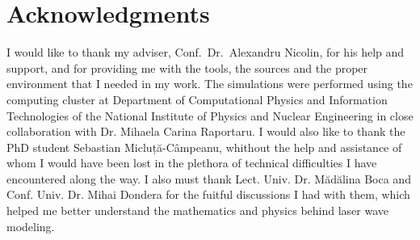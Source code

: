 \documentclass[12pt, class=report, crop=false]{standalone}
\begin{document}
\section*{Acknowledgments}
I would like to thank my adviser, Conf.~Dr.~Alexandru Nicolin, for his help and support, and for providing me with the tools, the sources and the proper environment that I needed in my work. The simulations were performed using the computing cluster at Department of Computational Physics and Information Technologies of the National Institute of Physics and Nuclear Engineering in close collaboration with Dr. Mihaela Carina Raportaru. I would also like to thank the PhD student Sebastian Micluță-Câmpeanu, whithout the help and assistance of whom I would have been lost in the plethora of technical difficulties I have encountered along the way. I also must thank Lect. Univ. Dr. Mădălina Boca  and Conf. Univ. Dr. Mihai Dondera for the fuitful discussions I had with them, which helped me better understand the mathematics and physics behind laser wave modeling.
\end{document}
